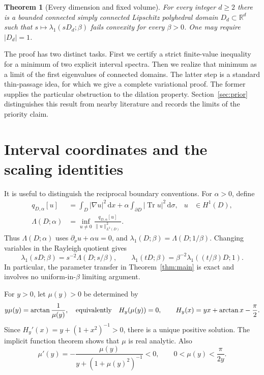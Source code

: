 \documentclass[11pt,a4paper]{article}
\newtheorem{theorem}{Theorem}[section]
\theoremstyle{definition}\newtheorem{definition}[theorem]{Definition}
\theoremstyle{remark}\newtheorem{remark}[theorem]{Remark}
\newcommand{\dd}{\,\mathrm d}
\DeclareMathOperator{\Tr}{Tr}
\begin{document}
\begin{theorem}[Every dimension and fixed volume]\label{thm:dimensions}
For every integer $d\ge2$ there is a bounded connected simply
connected Lipschitz polyhedral domain $D_d\subset\mathbb R^d$
such that $s\mapsto\lambda_1(sD_d;\beta)$ fails convexity for
every $\beta>0$. One may require $|D_d|=1$.
\end{theorem}

The proof has two distinct tasks. First we certify a strict
finite-value inequality for a minimum of two explicit interval
spectra. Then we realize that minimum as a limit of the first
eigenvalues of connected domains. The latter step is a standard
thin-passage idea, for which we give a complete variational proof.
The former supplies the particular obstruction to the dilation
property. Section~\ref{sec:prior} distinguishes this result from
nearby literature and records the limits of the priority claim.

\section{Interval coordinates and the scaling identities}

It is useful to distinguish the reciprocal boundary conventions.
For $\alpha>0$, define
\begin{align}
 q_{D,\alpha}[u]&=\int_D|\nabla u|^2\dd x
          +\alpha\int_{\partial D}|\Tr u|^2\dd\sigma,
 &u&\in H^1(D),\label{eq:form}\\
 \Lambda(D;\alpha)&=\inf_{u\ne0}
             \frac{q_{D,\alpha}[u]}{\|u\|_{L^2(D)}^2}.
 &&\label{eq:rayleigh}
\end{align}
Thus $\Lambda(D;\alpha)$ uses $\partial_\nu u+\alpha u=0$,
and $\lambda_1(D;\beta)=\Lambda(D;1/\beta)$.
Changing variables in the Rayleigh quotient gives
\begin{equation}\label{eq:scale}
 \lambda_1(sD;\beta)=s^{-2}\Lambda(D;s/\beta),
 \qquad
 \lambda_1(tD;\beta)
 =\beta^{-2}\lambda_1((t/\beta)D;1).
\end{equation}
In particular, the parameter transfer in Theorem~\ref{thm:main}
is exact and involves no uniform-in-$\beta$ limiting argument.

For $y>0$, let $\mu(y)>0$ be determined by
\begin{equation}\label{eq:mu}
 y\mu(y)=\arctan\frac1{\mu(y)},
 \quad\hbox{equivalently}\quad
 H_y(\mu(y))=0,
 \qquad H_y(x)=yx+\arctan x-\frac\pi2.
\end{equation}
Since $H_y'(x)=y+(1+x^2)^{-1}>0$, there is a unique positive
solution. The implicit function theorem shows that $\mu$ is
real analytic. Also
\begin{equation}\label{eq:mu-monotone-bound}
 \mu'(y)=-\frac{\mu(y)}{y+(1+\mu(y)^2)^{-1}}<0,
 \qquad 0<\mu(y)<\frac\pi{2y}.
\end{equation}
\end{document}
